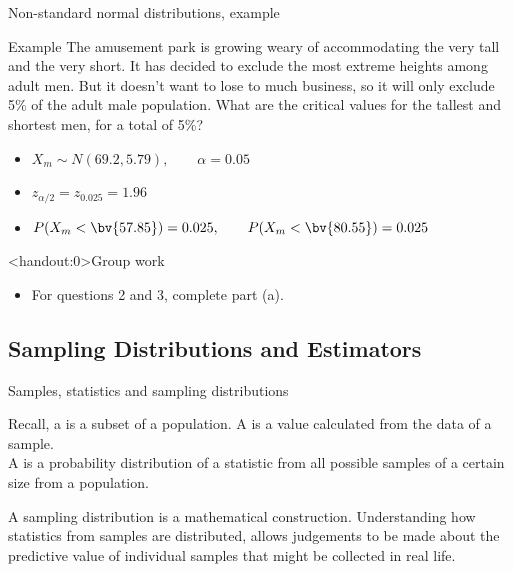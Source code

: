 \documentclass[xcolor=table, handout]{beamer}
\begin{document}
\begin{frame}{Non-standard normal distributions, example}
\begin{exampleblock}{Example}
The amusement park is growing weary of accommodating the very tall and the very short. It has decided to exclude the most extreme heights among adult men. But it doesn't want to lose to much business, so it will only exclude 5\% of the adult male population. What are the critical values for the tallest and shortest men, for a total of 5\%?
\begin{itemize} 
\pause\item $X_m \sim N(69.2, 5.79), \qquad \alpha = 0.05$
\pause\item $z_{\alpha/2} = z_{0.025} = 1.96$
\pause\item $P(X_m <  \bv{57.85}) = 0.025, \qquad P(X_m <  \bv{80.55}) = 0.025$
\end{itemize}

\end{exampleblock}
\end{frame}

\begin{frame}<handout:0>{Group work}
\begin{block}{}
\large
\begin{itemize}
\item For questions 2 and 3, complete part (a).
\end{itemize}
\end{block}
\end{frame}

\subsection{Sampling Distributions and Estimators}

\begin{frame}{Samples, statistics and sampling distributions}
\begin{block}{}
\large Recall, a  is a subset of a population. A  is a value calculated from the data of a sample.\\
\medskip
A  is a probability distribution of a statistic from all possible samples of a certain size from a population.
\end{block}

\pause
\begin{block}{}
\large
A sampling distribution is a mathematical construction. Understanding how statistics from samples are distributed, allows judgements to be made about the predictive value of individual samples that might be collected in real life.
\end{block}
\end{frame}
\end{document}

